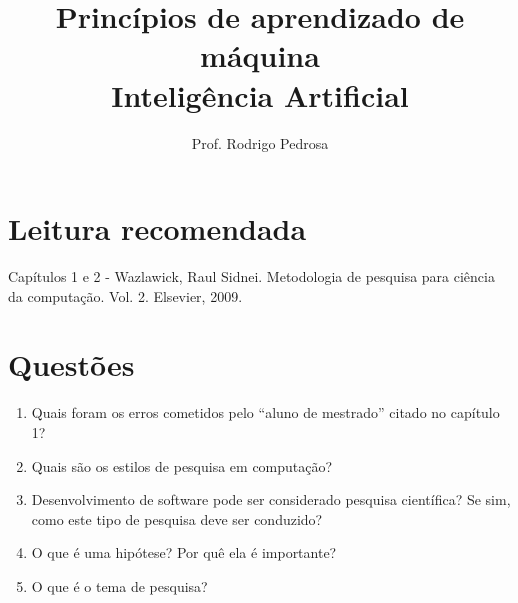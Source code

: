 \documentclass{article}
\title{Princípios de aprendizado de máquina \\ Inteligência Artificial}
\author{Prof. Rodrigo Pedrosa}
\begin{document}
\maketitle

\section{Leitura recomendada}

Capítulos 1 e 2 - Wazlawick, Raul Sidnei. Metodologia de pesquisa para ciência da computação. Vol. 2. Elsevier, 2009.


\section{Questões}

\begin{enumerate}

    \item Quais foram os erros cometidos pelo ``aluno de mestrado'' citado no capítulo 1?
    
    \item Quais são os estilos de pesquisa em computação?
    
    \item Desenvolvimento de software pode ser considerado pesquisa científica? Se sim, como este tipo de pesquisa deve ser conduzido?
    
    \item O que é uma hipótese? Por quê ela é importante?
    
    \item O que é o tema de pesquisa?
    
\end{enumerate}
    
%
%
\end{document}
